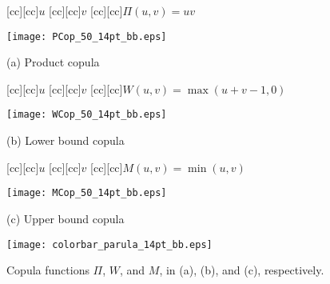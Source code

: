\documentclass[journal]{vgtc}                %
\begin{document}
\begin{figure*}
    \centering

  \begin{minipage}{0.27\textwidth}
   \centering
    \begin{psfrags}

      [cc][cc]{\footnotesize $u$}
      [cc][cc]{\footnotesize $v$}
      [cc][cc]{\footnotesize $\Pi(u,v) = uv$}

     \texttt{[image: PCop\_50\_14pt\_bb.eps]}\\ \smallskip

    \end{psfrags}

   \hspace{0.38cm} \footnotesize (a) Product copula
  \end{minipage}
  \hfill
  \begin{minipage}{0.27\textwidth}
   \centering
    \begin{psfrags}

      [cc][cc]{\footnotesize $u$}
      [cc][cc]{\footnotesize $v$}
      [cc][cc]{\footnotesize $W(u,v) = \max(u+v-1,0)$}

     \texttt{[image: WCop\_50\_14pt\_bb.eps]}\\ \smallskip

    \end{psfrags}

   \hspace{0.38cm} \footnotesize (b) Lower bound copula
  \end{minipage}
  \hfill
  \begin{minipage}{0.27\textwidth}
   \centering
    \begin{psfrags}

      [cc][cc]{\footnotesize $u$}
      [cc][cc]{\footnotesize $v$}
      [cc][cc]{\footnotesize $M(u,v) = \min(u,v)$}

     \texttt{[image: MCop\_50\_14pt\_bb.eps]}\\ \smallskip

    \end{psfrags}

   \hspace{0.38cm} \footnotesize (c) Upper bound copula
  \end{minipage}
  \hfill
  \begin{minipage}{0.05\textwidth}
   \centering

     \texttt{[image: colorbar\_parula\_14pt\_bb.eps]}\\ \smallskip

     \footnotesize \mbox{}
  \end{minipage}

  \caption{Copula functions $\Pi$, $W$, and $M$, in (a), (b), and (c), respectively.}
\label{fig:copulasbasicas}
\end{figure*}
\end{document}
